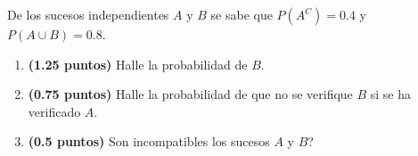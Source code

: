 
De los sucesos independientes $A$ y $B$ se sabe que $P(A^C)=0.4$ y $P(A\cup B)=0.8$.
\begin{enumerate}[label=\alph*)]
\item \textbf{(1.25 puntos)} Halle la probabilidad de $B$.
\item \textbf{(0.75 puntos)} Halle la probabilidad de que no se verifique $B$ si se ha verificado $A$.
\item \textbf{(0.5 puntos)} \textquestiondown{}Son incompatibles los sucesos $A$ y $B$?
\end{enumerate}
